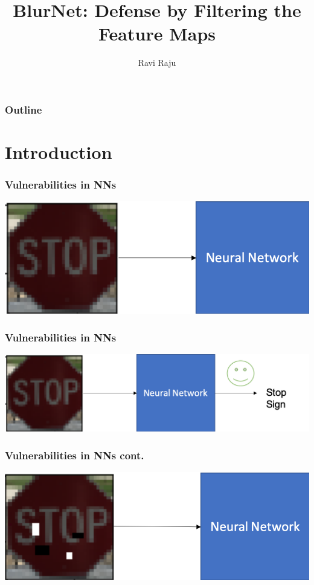 \documentclass{beamer}
\title{BlurNet: Defense by Filtering the Feature Maps}
\subtitle{Ravi Raju}
\begin{document}
\begin{frame}
	\titlepage
\end{frame}

\begin{frame}
\frametitle{Outline}
\tableofcontents
\end{frame}

\section{Introduction} %
\begin{frame}
\frametitle{Vulnerabilities in NNs}
\begin{center}
	\includegraphics[scale=0.4]{clean_class1.png}
\end{center}
\end{frame}

\begin{frame}
\frametitle{Vulnerabilities in NNs}
\begin{center}
	\includegraphics[scale=0.4]{cleanclassification2.png}
\end{center}
\end{frame}


\begin{frame}
\frametitle{Vulnerabilities in NNs cont.}
\begin{center}
	\includegraphics[scale=0.4]{advclassification1.png}
\end{center}
\end{frame}
\end{document}
